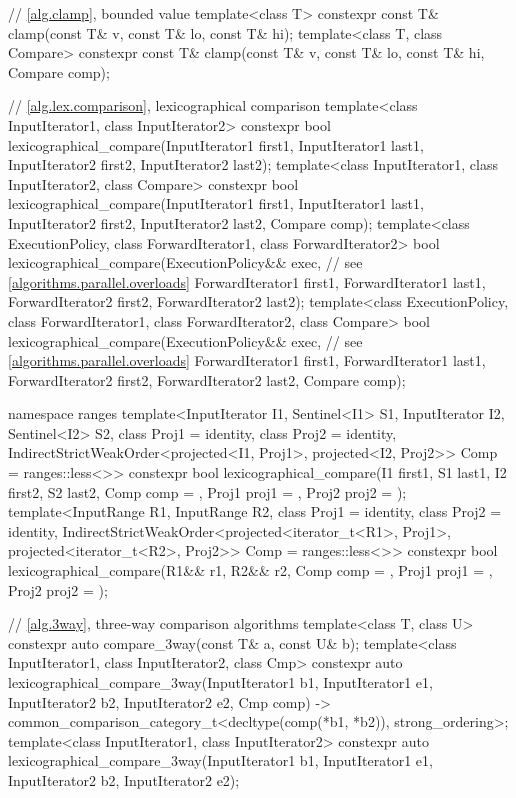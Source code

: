 \begin{codeblock}
{  // \ref{alg.clamp}, bounded value
  template<class T>
    constexpr const T& clamp(const T& v, const T& lo, const T& hi);
  template<class T, class Compare>
    constexpr const T& clamp(const T& v, const T& lo, const T& hi, Compare comp);

  // \ref{alg.lex.comparison}, lexicographical comparison
  template<class InputIterator1, class InputIterator2>
    constexpr bool
      lexicographical_compare(InputIterator1 first1, InputIterator1 last1,
                              InputIterator2 first2, InputIterator2 last2);
  template<class InputIterator1, class InputIterator2, class Compare>
    constexpr bool
      lexicographical_compare(InputIterator1 first1, InputIterator1 last1,
                              InputIterator2 first2, InputIterator2 last2,
                              Compare comp);
  template<class ExecutionPolicy, class ForwardIterator1, class ForwardIterator2>
    bool
      lexicographical_compare(ExecutionPolicy&& exec, // see \ref{algorithms.parallel.overloads}
                              ForwardIterator1 first1, ForwardIterator1 last1,
                              ForwardIterator2 first2, ForwardIterator2 last2);
  template<class ExecutionPolicy, class ForwardIterator1, class ForwardIterator2,
           class Compare>
    bool
      lexicographical_compare(ExecutionPolicy&& exec, // see \ref{algorithms.parallel.overloads}
                              ForwardIterator1 first1, ForwardIterator1 last1,
                              ForwardIterator2 first2, ForwardIterator2 last2,
                              Compare comp);

  namespace ranges {
    template<InputIterator I1, Sentinel<I1> S1, InputIterator I2, Sentinel<I2> S2,
             class Proj1 = identity, class Proj2 = identity,
             IndirectStrictWeakOrder<projected<I1, Proj1>, projected<I2, Proj2>> Comp =
               ranges::less<>>
      constexpr bool
        lexicographical_compare(I1 first1, S1 last1, I2 first2, S2 last2,
                                Comp comp = {}, Proj1 proj1 = {}, Proj2 proj2 = {});
    template<InputRange R1, InputRange R2, class Proj1 = identity,
             class Proj2 = identity,
             IndirectStrictWeakOrder<projected<iterator_t<R1>, Proj1>,
                                     projected<iterator_t<R2>, Proj2>> Comp = ranges::less<>>
      constexpr bool
        lexicographical_compare(R1&& r1, R2&& r2, Comp comp = {},
                                Proj1 proj1 = {}, Proj2 proj2 = {});
  }

  // \ref{alg.3way}, three-way comparison algorithms
  template<class T, class U>
    constexpr auto compare_3way(const T& a, const U& b);
  template<class InputIterator1, class InputIterator2, class Cmp>
    constexpr auto
      lexicographical_compare_3way(InputIterator1 b1, InputIterator1 e1,
                                   InputIterator2 b2, InputIterator2 e2,
                                   Cmp comp)
        -> common_comparison_category_t<decltype(comp(*b1, *b2)), strong_ordering>;
  template<class InputIterator1, class InputIterator2>
    constexpr auto
      lexicographical_compare_3way(InputIterator1 b1, InputIterator1 e1,
                                   InputIterator2 b2, InputIterator2 e2);

}
\end{codeblock}
